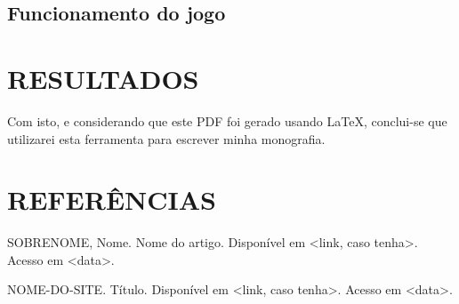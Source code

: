 \documentclass[12pt,a4paper]{article}
\begin{document}
	\subsection{Funcionamento do jogo}
	


\clearpage %
\section{RESULTADOS}
	Com isto, e considerando que este PDF foi gerado usando \LaTeX , conclui-se que utilizarei esta ferramenta para escrever minha monografia.

\clearpage %
\section*{REFERÊNCIAS}
	\singlespace
	SOBRENOME, Nome. Nome do artigo. Disponível em <link, caso tenha>. Acesso em <data>.
	
	NOME-DO-SITE. Título. Disponível em <link, caso tenha>. Acesso em <data>.
\end{document}

